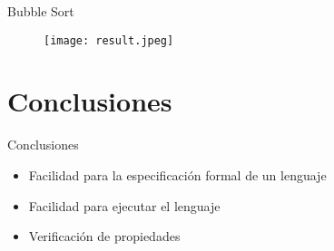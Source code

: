 \documentclass{beamer}
\begin{document}
    \begin{frame}[fragile]{Bubble Sort}
        \begin{figure}
            \texttt{[image: result.jpeg]}
        \end{figure}
    \end{frame}


    \section{Conclusiones}
    \begin{frame}{Conclusiones}
        \begin{itemize}
            \item Facilidad para la especificación formal de un lenguaje
            \item Facilidad para ejecutar el lenguaje
            \item Verificación de propiedades
        \end{itemize}
    \end{frame}
\end{document}
